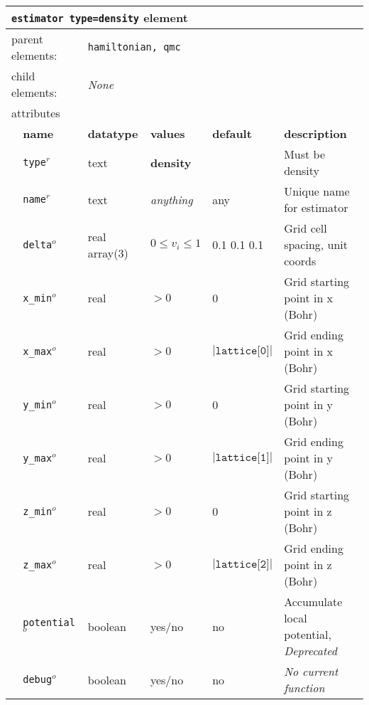 \FloatBarrier
\begin{table}[h]
\begin{center}
\begin{tabularx}{\textwidth}{l l l l l l }
\hline
\multicolumn{6}{l}{\texttt{estimator type=density} element} \\
\hline
\multicolumn{2}{l}{parent elements:} & \multicolumn{4}{l}{\texttt{hamiltonian, qmc}}\\
\multicolumn{2}{l}{child  elements:} & \multicolumn{4}{l}{\textit{None}}\\
\multicolumn{2}{l}{attributes}  & \multicolumn{4}{l}{}\\
   &   \bfseries name     & \bfseries datatype & \bfseries values  & \bfseries default   & \bfseries description \\
   & \texttt{type}$^r$      &  text              & \textbf{density}      &                     & Must be density         \\
   & \texttt{name}$^r$      &  text              & \textit{anything}     & any                 & Unique name for estimator \\
   & \texttt{delta}$^o$     &  real array(3)     & $0\le v_i \le 1$      & 0.1 0.1 0.1         & Grid cell spacing, unit coords\\
   & \texttt{x\_min}$^o$    &  real              & $>0$                  & 0                   & Grid starting point in x (Bohr)\\
   & \texttt{x\_max}$^o$    &  real              & $>0$                  &$|\texttt{lattice[0]}|$& Grid ending point in x (Bohr)\\
   & \texttt{y\_min}$^o$    &  real              & $>0$                  & 0                   & Grid starting point in y (Bohr)\\
   & \texttt{y\_max}$^o$    &  real              & $>0$                  &$|\texttt{lattice[1]}|$& Grid ending point in y (Bohr)\\
   & \texttt{z\_min}$^o$    &  real              & $>0$                  & 0                   & Grid starting point in z (Bohr)\\
   & \texttt{z\_max}$^o$    &  real              & $>0$                  &$|\texttt{lattice[2]}|$& Grid ending point in z (Bohr)\\
   & \texttt{potential}$^o$ &  boolean           & yes/no                & no                  & Accumulate local potential, \textit{Deprecated}\\
   & \texttt{debug}$^o$     &  boolean           & yes/no                & no                  & \textit{No current function}\\
  \hline
\end{tabularx}
\end{center}
\end{table}
\FloatBarrier


